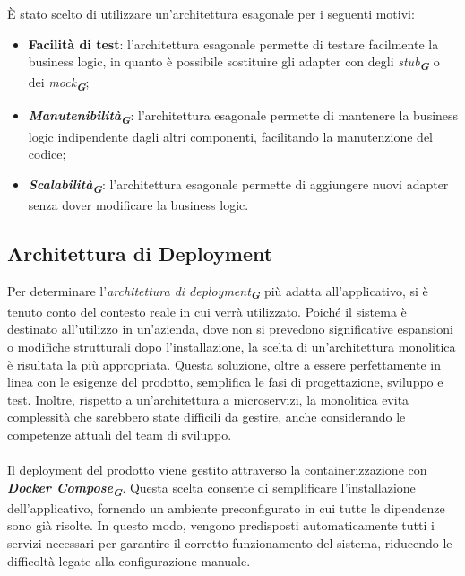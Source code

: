È stato scelto di utilizzare un'architettura esagonale per i seguenti motivi:
\begin{itemize}
    \item \textbf{Facilità di test}: l'architettura esagonale permette di testare facilmente la business logic, in quanto è possibile sostituire gli adapter con degli \emph{stub}\textsubscript{\textbf{\textit{G}}} o dei \emph{mock}\textsubscript{\textbf{\textit{G}}};
    \item \textbf{\emph{Manutenibilità}}\textsubscript{\textbf{\textit{G}}}: l'architettura esagonale permette di mantenere la business logic indipendente dagli altri componenti, facilitando la manutenzione del codice;
    \item \textbf{\emph{Scalabilità}}\textsubscript{\textbf{\textit{G}}}: l'architettura esagonale permette di aggiungere nuovi adapter senza dover modificare la business logic.
\end{itemize}


\subsection{Architettura di Deployment}
\label{sec:architettura_deployment}

Per determinare l'\emph{architettura di deployment}\textsubscript{\textbf{\textit{G}}} più adatta all'applicativo, si è tenuto conto del contesto reale in cui verrà utilizzato. Poiché il sistema è destinato all'utilizzo in un'azienda, dove non si prevedono significative espansioni o modifiche strutturali dopo l'installazione, la scelta di un'architettura monolitica è risultata la più appropriata. Questa soluzione, oltre a essere perfettamente in linea con le esigenze del prodotto, semplifica le fasi di progettazione, sviluppo e test. Inoltre, rispetto a un'architettura a microservizi, la monolitica evita complessità che sarebbero state difficili da gestire, anche considerando le competenze attuali del team di sviluppo.\\\\
Il deployment del prodotto viene gestito attraverso la containerizzazione con \textbf{\emph{Docker Compose}}\textsubscript{\textbf{\textit{G}}}. Questa scelta consente di semplificare l’installazione dell’applicativo, fornendo un ambiente preconfigurato in cui tutte le dipendenze sono già risolte. In questo modo, vengono predisposti automaticamente tutti i servizi necessari per garantire il corretto funzionamento del sistema, riducendo le difficoltà legate alla configurazione manuale.


